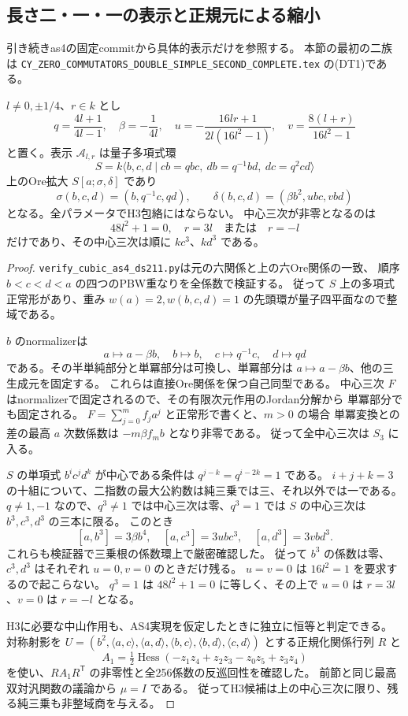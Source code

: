 \subsection{長さ二・一・一の表示と正規元による縮小}
\label{subsec:as4-ds211-exclusions}
引き続きas4の固定commit\cite{AS4lowpinned}から具体的表示だけを参照する。
本節の最初の二族は
{\small\texttt{CY\_ZERO\_COMMUTATORS\_DOUBLE\_SIMPLE\_SECOND\_COMPLETE.tex}}
の(DT1)である。

\begin{theorem}[二パラメータOre表示の全排除]
\label{thm:ds211-A-all-excluded}
$l\ne0,\pm1/4$、$r\in k$ とし
\[
 q=\frac{4l+1}{4l-1},\quad \beta=-\frac1{4l},\quad
 u=-\frac{16lr+1}{2l(16l^2-1)},\quad v=\frac{8(l+r)}{16l^2-1}
\]
と置く。表示 $\mathcal A_{l,r}$ は量子多項式環
\[
 S=k\langle b,c,d\mid cb=qbc,\ db=q^{-1}bd,\ dc=q^2cd\rangle
\]
上のOre拡大 $S[a;\sigma,\delta]$ であり
\[
 \sigma(b,c,d)=(b,q^{-1}c,qd),\qquad
 \delta(b,c,d)=(\beta b^2,u bc,v bd)
\]
となる。全パラメータでH3包絡にはならない。
中心三次が非零となるのは
\[
 48l^2+1=0,\quad r=3l\quad\text{または}\quad r=-l
\]
だけであり、その中心三次は順に $kc^3$、$kd^3$ である。
\end{theorem}
\begin{proof}
\texttt{verify\_cubic\_as4\_ds211.py}は元の六関係と上の六Ore関係の一致、
順序 $b<c<d<a$ の四つのPBW重なりを全係数で検証する。
従って $S$ 上の多項式正常形があり、重み $w(a)=2,w(b,c,d)=1$ の先頭環が量子四平面なので整域である。

$b$ のnormalizerは
\[
 a\longmapsto a-\beta b,\quad b\longmapsto b,\quad
 c\longmapsto q^{-1}c,\quad d\longmapsto qd
\]
である。その半単純部分と単冪部分は可換し、単冪部分は $a\mapsto a-\beta b$、他の三生成元を固定する。
これらは直接Ore関係を保つ自己同型である。
中心三次 $F$ はnormalizerで固定されるので、その有限次元作用のJordan分解から
単冪部分でも固定される。
$F=\sum_{j=0}^m f_j a^j$ と正常形で書くと、$m>0$ の場合
単冪変換との差の最高 $a$ 次数係数は $-m\beta f_m b$ となり非零である。
従って全中心三次は $S_3$ に入る。

$S$ の単項式 $b^ic^jd^k$ が中心である条件は
$q^{j-k}=q^{i-2k}=1$ である。
$i+j+k=3$ の十組について、二指数の最大公約数は純三乗では三、それ以外では一である。
$q\ne1,-1$ なので、$q^3\ne1$ では中心三次は零、$q^3=1$ では
$S$ の中心三次は $b^3,c^3,d^3$ の三本に限る。
このとき
\[
 [a,b^3]=3\beta b^4,\quad
 [a,c^3]=3u bc^3,\quad [a,d^3]=3v bd^3.
\]
これらも検証器で三乗根の係数環上で厳密確認した。
従って $b^3$ の係数は零、$c^3,d^3$ はそれぞれ $u=0,v=0$ のときだけ残る。
$u=v=0$ は $16l^2=1$ を要求するので起こらない。
$q^3=1$ は $48l^2+1=0$ に等しく、その上で $u=0$ は $r=3l$、$v=0$ は $r=-l$ となる。

H3に必要な中山作用も、AS4実現を仮定したときに独立に恒等と判定できる。
対称射影を $U=(b^2,\langle a,c\rangle,\langle a,d\rangle,
\langle b,c\rangle,\langle b,d\rangle,\langle c,d\rangle)$ とする正規化関係行列 $R$ と
\[
 A_1=\tfrac12\operatorname{Hess}(-z_1z_4+z_2z_3-z_0z_5+z_3z_4)
\]
を使い、$RA_1R^{\mathsf T}$ の非零性と全256係数の反巡回性を確認した。
前節と同じ最高双対汎関数の議論から $\mu=I$ である。
従ってH3候補は上の中心三次に限り、残る純三乗も非整域商を与える。
\end{proof}

